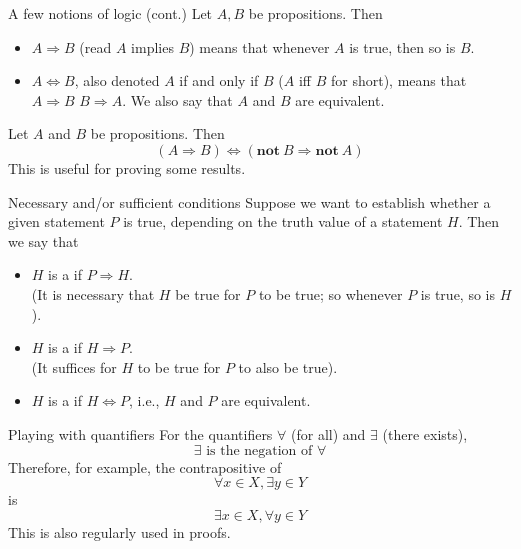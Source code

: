 \documentclass[aspectratio=169]{beamer}
\begin{document}
\begin{frame}{A few notions of logic (cont.)}
Let $A,B$ be propositions. Then
\begin{itemize}
\item $A\Rightarrow B$ (read $A$ implies $B$) means that whenever $A$ is true,
then so is $B$.
\item $A\Leftrightarrow B$, also denoted $A$ if and only if $B$ ($A$
iff $B$ for short), means that $A\Rightarrow B$  $B\Rightarrow A$.
We also say that $A$ and $B$ are equivalent.
\end{itemize}
Let $A$ and $B$ be propositions. Then
\[
(A\Rightarrow B)\Leftrightarrow(\mathbf{not}\ B\Rightarrow\mathbf{not}\ A)
\]
This is useful for proving some results.
\end{frame}



\begin{frame}{Necessary and/or sufficient conditions}
Suppose we want to establish whether a given statement $P$ is true, depending
on the truth value of a statement $H$. Then we say that
\begin{itemize}
\item $H$ is a  if $P\Rightarrow H$. \\
(It is necessary that $H$ be true for $P$ to be true; so whenever
$P$ is true, so is $H$).
\item $H$ is a  if $H\Rightarrow P$. \\
(It suffices for $H$ to be true for $P$ to also be true).
\item $H$ is a  if $H\Leftrightarrow
P$, i.e., $H$ and $P$ are equivalent.
\end{itemize}
\end{frame}


\begin{frame}{Playing with quantifiers}
For the quantifiers $\forall$ (for all) and $\exists$ (there exists),
\[
    \exists \text{ is the negation of } \forall
\]
Therefore, for example, the contrapositive of
\[
\forall x\in X,\exists y\in Y
\]
is
\[
\exists x\in X,\forall y\in Y
\]
This is also regularly used in proofs.
\end{frame}


\end{document}
